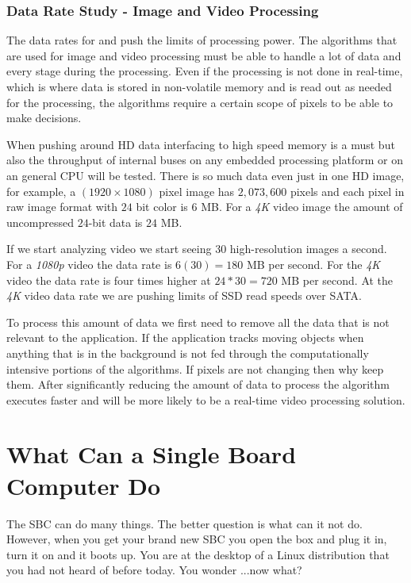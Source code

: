 \subsubsection{Data Rate Study - Image and Video Processing}

The data rates for  and  push the limits of processing power. The algorithms that are used for image and video processing must be able to handle a lot of data and every stage during the processing. Even if the processing is not done in real-time, which is where data is stored in non-volatile memory and is read out as needed for the processing, the algorithms require a certain scope of pixels to be able to make decisions.

When pushing around \ac{HD} data interfacing to high speed memory is a must but also the throughput of internal buses on any embedded processing platform or on an general \ac{CPU} will be tested. There is so much data even just in one \ac{HD} image, for example, a $(1920\times1080)$ pixel image has $2,073,600$ pixels and each pixel in raw image format with $24$ bit color is $6$ \ac{MB}. For a \emph{4K} video image the amount of uncompressed $24$-bit data is $24$ \ac{MB}.

If we start analyzing video we start seeing $30$ high-resolution images a second. For a \emph{1080p} video the data rate is $6(30)=180$ \ac{MB} per second. For the \emph{4K} video the data rate is four times higher at $24*30=720$ \ac{MB} per second. At the \emph{4K} video data rate we are pushing limits of \ac{SSD} read speeds over \ac{SATA}.

To process this amount of data we first need to remove all the data that is not relevant to the application. If the application tracks moving objects when anything that is in the background is not fed through the computationally intensive portions of the algorithms. If pixels are not changing then why keep them. After significantly reducing the amount of data to process the algorithm executes faster and will be more likely to be a real-time video processing solution.
	
\section{What Can a Single Board Computer Do}

The \ac{SBC} can do many things. The better question is what can it not do. However, when you get your brand new \ac{SBC} you open the box and plug it in, turn it on and it boots up. You are at the desktop of a Linux distribution that you had not heard of before today. You wonder ...now what?

